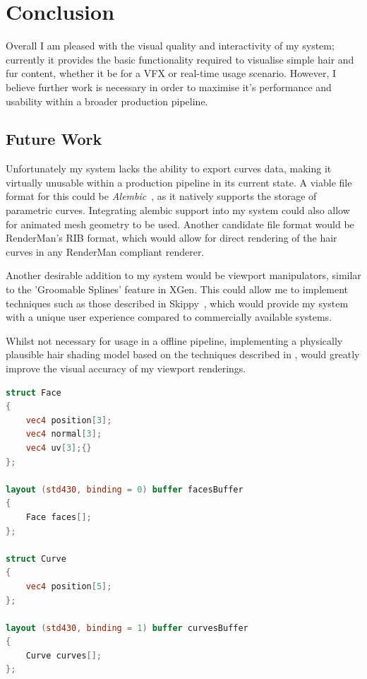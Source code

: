 \documentclass[]{acmsiggraph}
\begin{document}
\section{Conclusion} \label{sec:conclusion}

Overall I am pleased with the visual quality and interactivity of my system; currently it provides the basic functionality required to visualise simple hair and fur content, whether it be for a VFX or real-time usage scenario. However, I believe further work is necessary in order to maximise it's performance and usability within a broader production pipeline.

\subsection{Future Work} \label{sec:futurework}

Unfortunately my system lacks the ability to export curves data, making it virtually unusable within a production pipeline in its current state. A viable file format for this could be \textit{Alembic}~\cite{alembic}, as it natively supports the storage of parametric curves. Integrating alembic support into my system could also allow for animated mesh geometry to be used. Another candidate file format would be RenderMan's RIB format, which would allow for direct rendering of the hair curves in any RenderMan compliant renderer.

Another desirable addition to my system would be viewport manipulators, similar to the 'Groomable Splines' feature in XGen. This could allow me to implement techniques such as those described in Skippy~\cite{skippy}, which would provide my system with a unique user experience compared to commercially available systems.

Whilst not necessary for usage in a offline pipeline, implementing a physically plausible hair shading model based on the techniques described in \cite{Marschner}, would greatly improve the visual accuracy of my viewport renderings.

\newpage




\newpage
\appendix

\begin{lstlisting}[language=GLSL, label={lst:buffers}, caption={Extract from the Distributor compute shader, showing how the Mesh and Curves buffers are accessed.}]
struct Face
{
	vec4 position[3];
	vec4 normal[3];
	vec4 uv[3];{}
};

layout (std430, binding = 0) buffer facesBuffer
{
	Face faces[];
};

struct Curve
{
	vec4 position[5];
};

layout (std430, binding = 1) buffer curvesBuffer
{
	Curve curves[];
};
\end{lstlisting}
\end{document}
